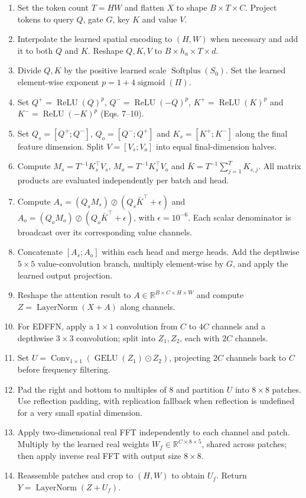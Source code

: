 \documentclass[10pt]{article}
\begin{document}
\begin{enumerate}[label=\arabic*:,leftmargin=2em,itemsep=3pt]
\item Set the token count $T=HW$ and flatten $X$ to shape $B\times T\times C$. Project tokens to query $Q$, gate $G$, key $K$ and value $V$.
\item Interpolate the learned spatial encoding to $(H,W)$ when necessary and add it to both $Q$ and $K$. Reshape $Q,K,V$ to $B\times h_a\times T\times d$.
\item Divide $Q,K$ by the positive learned scale $\operatorname{Softplus}(S_0)$. Set the learned element-wise exponent $p=1+4\operatorname{sigmoid}(\Pi)$.
\item Set $Q^+=\operatorname{ReLU}(Q)^p$, $Q^-=\operatorname{ReLU}(-Q)^p$, $K^+=\operatorname{ReLU}(K)^p$ and $K^-=\operatorname{ReLU}(-K)^p$ (Eqs. 7--10).
\item Set $Q_s=[Q^+;Q^-]$, $Q_o=[Q^-;Q^+]$ and $K_s=[K^+;K^-]$ along the final feature dimension. Split $V=[V_s;V_o]$ into equal final-dimension halves.
\item Compute $M_s=T^{-1}K_s^\top V_s$, $M_o=T^{-1}K_s^\top V_o$ and $\bar K=T^{-1}\sum_{j=1}^{T}K_{s,j}$. All matrix products are evaluated independently per batch and head.
\item Compute $A_s=(Q_sM_s)\oslash(Q_s\bar K^\top+\epsilon)$ and $A_o=(Q_oM_o)\oslash(Q_o\bar K^\top+\epsilon)$, with $\epsilon=10^{-6}$. Each scalar denominator is broadcast over its corresponding value channels.
\item Concatenate $[A_s;A_o]$ within each head and merge heads. Add the depthwise $5\times5$ value-convolution branch, multiply element-wise by $G$, and apply the learned output projection.
\item Reshape the attention result to $A\in\mathbb R^{B\times C\times H\times W}$ and compute $Z=\operatorname{LayerNorm}(X+A)$ along channels.
\item For EDFFN, apply a $1\times1$ convolution from $C$ to $4C$ channels and a depthwise $3\times3$ convolution; split into $Z_1,Z_2$, each with $2C$ channels.
\item Set $U=\operatorname{Conv}_{1\times1}(\operatorname{GELU}(Z_1)\odot Z_2)$, projecting $2C$ channels back to $C$ before frequency filtering.
\item Pad the right and bottom to multiples of 8 and partition $U$ into $8\times8$ patches. Use reflection padding, with replication fallback when reflection is undefined for a very small spatial dimension.
\item Apply two-dimensional real FFT independently to each channel and patch. Multiply by the learned real weights $W_f\in\mathbb R^{C\times8\times5}$, shared across patches; then apply inverse real FFT with output size $8\times8$.
\item Reassemble patches and crop to $(H,W)$ to obtain $U_f$. Return $Y=\operatorname{LayerNorm}(Z+U_f)$.
\end{enumerate}
\end{document}
